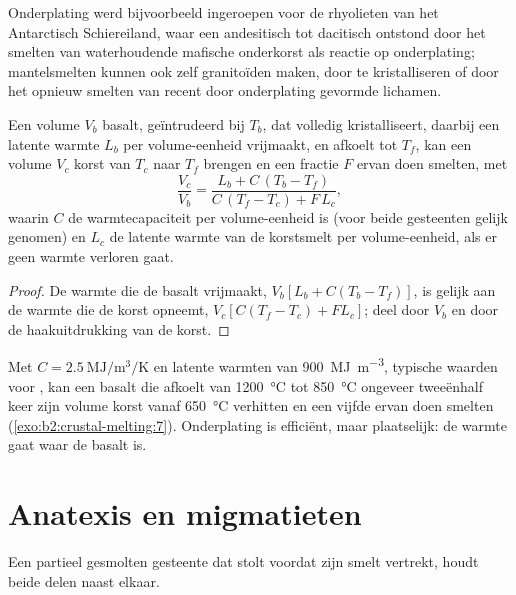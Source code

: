 Onderplating werd bijvoorbeeld ingeroepen voor de rhyolieten van het Antarctisch Schiereiland,
waar een andesitisch tot dacitisch  ontstond door het smelten van waterhoudende mafische onderkorst als
reactie op onderplating; mantelsmelten kunnen ook zelf granitoïden maken, door te
kristalliseren of door het opnieuw smelten van recent door onderplating gevormde lichamen.

\begin{proposition}\label{prop:b2:crustal-melting:heat}
Een volume $V_b$ basalt, geïntrudeerd bij $T_b$, dat volledig kristalliseert, daarbij een
latente warmte $L_b$ per volume-eenheid vrijmaakt, en afkoelt tot $T_f$, kan een volume $V_c$ korst
van $T_c$ naar $T_f$ brengen en een fractie $F$ ervan doen smelten, met
\[\frac{V_c}{V_b} = \frac{L_b + C\,(T_b - T_f)}{C\,(T_f - T_c) + F\,L_c},\]
waarin $C$ de warmtecapaciteit per volume-eenheid is (voor beide gesteenten gelijk genomen) en $L_c$ de
latente warmte van de korstsmelt per volume-eenheid, als er geen warmte verloren gaat.
\end{proposition}

\begin{proof}
De warmte die de basalt vrijmaakt, $V_b[L_b + C(T_b - T_f)]$, is gelijk aan de warmte die
de korst opneemt, $V_c[C(T_f - T_c) + F L_c]$; deel door $V_b$ en door de haakuitdrukking van de korst.
\end{proof}

Met $C = \qty{2.5}{\mega\joule\per\cubic\metre\per\kelvin}$ en latente warmten van
\qty{900}{\mega\joule\per\cubic\metre}, typische waarden voor , kan een basalt die afkoelt van
\qty{1200}{\celsius} tot \qty{850}{\celsius} ongeveer tweeënhalf keer zijn volume
korst vanaf \qty{650}{\celsius} verhitten en een vijfde ervan doen smelten (\cref{exo:b2:crustal-melting:7}).
Onderplating is efficiënt, maar plaatselijk: de warmte gaat waar de basalt is.

\section{Anatexis en migmatieten}\label{sec:b2:crustal-melting:migmatites}

Een partieel gesmolten gesteente dat stolt voordat zijn smelt vertrekt, houdt beide delen naast elkaar.

